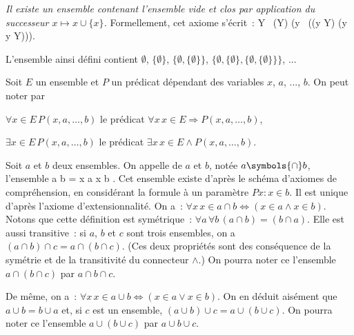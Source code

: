 \done

\blank[medium]

\noindent\emph{ Il existe un ensemble contenant l'ensemble vide et clos par application du successeur $x \mapsto x \cup \lbrace x \rbrace$.} Formellement, cet axiome s'écrit : 
\startformula
    \exists Y \, (\emptyset \in Y) \wedge (\forall y \, ((y \in Y) \Rightarrow (y \cup \lbrace y \rbrace \in Y))). 
\stopformula

\blank[medium]

L'ensemble ainsi défini contient $\emptyset$, $\lbrace \emptyset \rbrace$, $\lbrace \emptyset, \lbrace \emptyset \rbrace \rbrace$, $\lbrace \emptyset, \lbrace \emptyset \rbrace, \lbrace \emptyset, \lbrace \emptyset \rbrace \rbrace \rbrace$, ...

\blank[medium]

\noindent{} Soit $E$ un ensemble et $P$ un prédicat dépendant des variables $x$, $a$, ..., $b$.
    On peut noter par 
    \startitemize[nowhite]
      \item $\forall x \in E \, P(x, a, \dots, b)$ le prédicat $\forall x \, x \in E \Rightarrow P(x, a, \dots, b)$,
      \item $\exists x \in E \, P(x, a, \dots, b)$ le prédicat $\exists x \, x \in E \wedge P(x, a, \dots, b)$.
    \stopitemize

\stopsubsection

\startsubsection[title=Intersection]

Soit $a$ et $b$ deux ensembles. 
On appelle \emph{} de $a$ et $b$, notée $a \symbols{\cap} b$, l'ensemble 
\startformula
    a \cap b = \lbrace x \in a \vert x \in b \rbrace. 
\stopformula
Cet ensemble existe d'après le schéma d'axiomes de compréhension, en considérant la formule à un paramètre $P x: x \in b$. 
Il est unique d'après l'axiome d'extensionnalité.
On a : $\forall x \, x \in a \cap b \Leftrightarrow (x \in a \wedge x \in b)$. 
Notons que cette définition est symétrique : $\forall a \, \forall b \, (a \cap b) = (b \cap a)$.  
Elle est aussi transitive : si $a$, $b$ et $c$ sont trois ensembles, on a $(a \cap b) \cap c = a \cap (b \cap c)$. 
(Ces deux propriétés sont des conséquence de la symétrie et de la transitivité du connecteur $\wedge$.)
On pourra noter ce l'ensemble $a \cap (b \cap c)$ par $a \cap b \cap c$. 

De même, on a : $\forall x \, x \in a \cup b \Leftrightarrow (x \in a \vee x \in b)$. 
On en déduit aisément que $a \cup b = b \cup a$ et, si $c$ est un ensemble, $(a \cup b) \cup c = a \cup (b \cup c)$. 
On pourra noter ce l'ensemble $a \cup (b \cup c)$ par $a \cup b \cup c$. 

